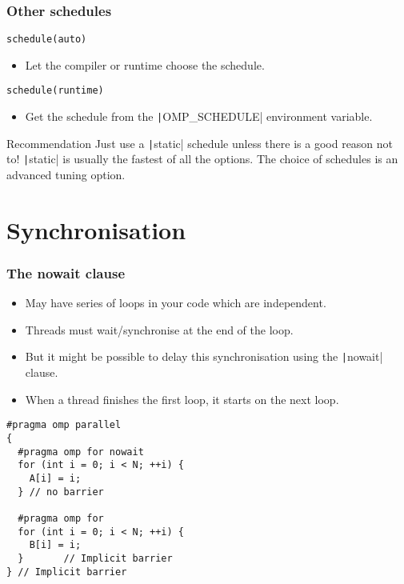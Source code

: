 \documentclass{beamer}
\begin{document}
\begin{frame}[fragile]
\frametitle{Other schedules}
\begin{verbatim}
schedule(auto)
\end{verbatim}
\begin{itemize}
  \item Let the compiler or runtime choose the schedule.
\end{itemize}

\vfill

\begin{verbatim}
schedule(runtime)
\end{verbatim}
\begin{itemize}
  \item Get the schedule from the \texttt|OMP_SCHEDULE| environment variable.
\end{itemize}

\begin{block}{Recommendation}
Just use a \texttt|static| schedule unless there is a good reason not to!
\texttt|static| is usually the fastest of all the options.
The choice of schedules is an advanced tuning option.
\end{block}

\end{frame}

\section{Synchronisation}
\begin{frame}[fragile]
\frametitle{The nowait clause}
\begin{itemize}
  \item May have series of loops in your code which are independent.
  \item Threads must wait/synchronise at the end of the loop.
  \item But it might be possible to delay this synchronisation using the \texttt|nowait| clause.
  \item When a thread finishes the first loop, it starts on the next loop.
\end{itemize}

\begin{verbatim}
#pragma omp parallel
{
  #pragma omp for nowait
  for (int i = 0; i < N; ++i) {
    A[i] = i;
  } // no barrier

  #pragma omp for
  for (int i = 0; i < N; ++i) {
    B[i] = i;
  }       // Implicit barrier
} // Implicit barrier
\end{verbatim}
\end{frame}
\end{document}
